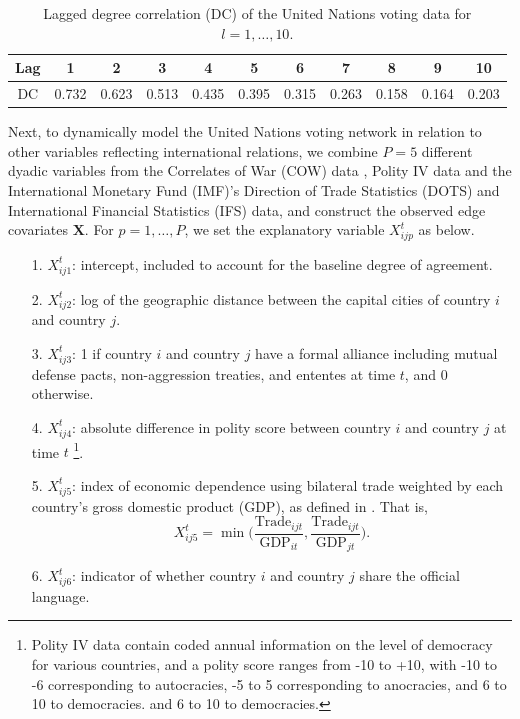 \documentclass[a4paper]{article}
\begin{document}
\begin{table}[ht]
	\centering
	\begin{tabular}{ |c|c|c|c|c|c|c|c|c|c|c|} 
		\hline
		{Lag}	& 1 & 2& 3& 4& 5& 6& 7&8&9&10 \\ \hline
		DC & 0.732&0.623&0.513&0.435&0.395&0.315&0.263&0.158&0.164& 0.203\\\hline
	\end{tabular}
	\caption {Lagged degree correlation (DC) of the United Nations voting data for $l=1,\ldots, 10$.}
	\label{table:corr}
\end{table}
\newline \newline Next, to dynamically model the United Nations voting network in relation to other variables reflecting international relations, we combine $P=5$ different dyadic variables from the Correlates of War (COW) data \citep{gibler2008international}, Polity IV data \citep{marshall2014polity} and the International Monetary Fund (IMF)'s Direction of Trade Statistics (DOTS) and International Financial Statistics (IFS) data, and construct the observed edge covariates $\mathbf{X}$. For $p=1,\ldots,P$, we set the explanatory variable $X^t_{ijp}$ as below.
\begin{itemize}
	\item [1.] $X^t_{ij1}$: intercept, included to account for the baseline degree of agreement.
	\item [2.] $X^t_{ij2}$: log of the geographic distance between the capital cities of country $i$ and country $j$.
	\item [3.] $X^t_{ij3}$: 1 if country $i$ and country $j$ have a formal alliance including mutual defense pacts, non-aggression treaties, and ententes at time $t$, and 0 otherwise.
	\item [4.] $X^t_{ij4}$: absolute difference in polity score between country $i$ and country $j$ at time $t$ \footnote{Polity IV data contain coded annual information on the level of democracy for various countries, and a polity score ranges from -10 to +10, with -10 to -6 corresponding to autocracies, -5 to 5 corresponding to anocracies, and 6 to 10 to democracies. and 6 to 10 to democracies.}.
	\item [5.] $X^t_{ij5}$: index of economic dependence using bilateral trade weighted by each country's gross domestic product (GDP), as defined in \cite{gartzke2000preferences}. That is, $$X^t_{ij5} = \min\Big(\frac{\mbox{Trade}_{ijt}}{\mbox{GDP}_{it}}, \frac{\mbox{Trade}_{ijt}}{\mbox{GDP}_{jt}}\Big).$$
	\item [6.] $X^t_{ij6}$: indicator of whether country $i$ and country $j$ share the official language.
\end{itemize}
\end{document}
